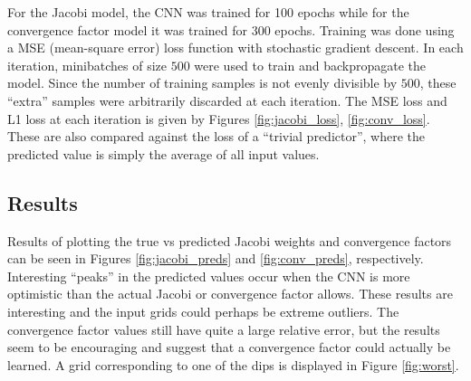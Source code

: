 For the Jacobi model, the CNN was trained for 100 epochs while for the convergence factor model it was trained for 300 epochs.  Training was done using a MSE (mean-square error) loss function with stochastic gradient descent.  In each iteration, minibatches of size $500$ were used to train and backpropagate the model.  Since the number of training samples is not evenly divisible by $500$, these ``extra'' samples were arbitrarily discarded at each iteration.  The MSE loss and L1 loss at each iteration is given by Figures \ref{fig:jacobi_loss}, \ref{fig:conv_loss}.  These are also compared against the loss of a ``trivial predictor'', where the predicted value is simply the average of all input values.

\subsection{Results}

Results of plotting the true vs predicted Jacobi weights and convergence factors can be seen in Figures \ref{fig:jacobi_preds} and \ref{fig:conv_preds}, respectively.  Interesting ``peaks'' in the predicted values occur when the CNN is more optimistic than the actual Jacobi or convergence factor allows.  These results are interesting and the input grids could perhaps be extreme outliers.  The convergence factor values still have quite a large relative error, but the results seem to be encouraging and suggest that a convergence factor could actually be learned.  A grid corresponding to one of the dips is displayed in Figure \ref{fig:worst}.

